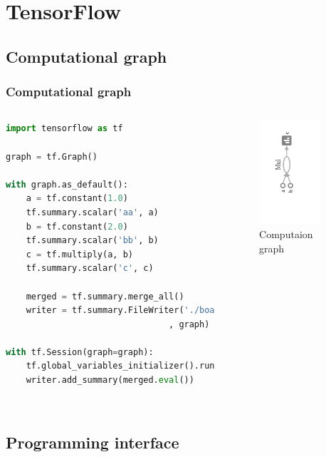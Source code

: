 
\section{TensorFlow}\label{sec:TF}

\subsection{Computational graph}

\begin{frame}[fragile]
  \MyLogo
  \frametitle{Computational graph}  
%  
\begin{columns}
\tiny{
\begin{lstlisting}[language=python]
import tensorflow as tf

graph = tf.Graph()

with graph.as_default():
	a = tf.constant(1.0)
	tf.summary.scalar('aa', a)
	b = tf.constant(2.0)
	tf.summary.scalar('bb', b)
	c = tf.multiply(a, b)
	tf.summary.scalar('c', c)
	
	merged = tf.summary.merge_all()
	writer = tf.summary.FileWriter('./board'
								, graph)

with tf.Session(graph=graph):
	tf.global_variables_initializer().run()
	writer.add_summary(merged.eval())
	
\end{lstlisting}
}
%
%
\begin{figure}[htbp] 
   \includegraphics[height=1.5in]{figures/compgraph.png} 
\caption{Computaion graph}
\end{figure}
\end{columns}
\end{frame}

\subsection{Programming interface}

